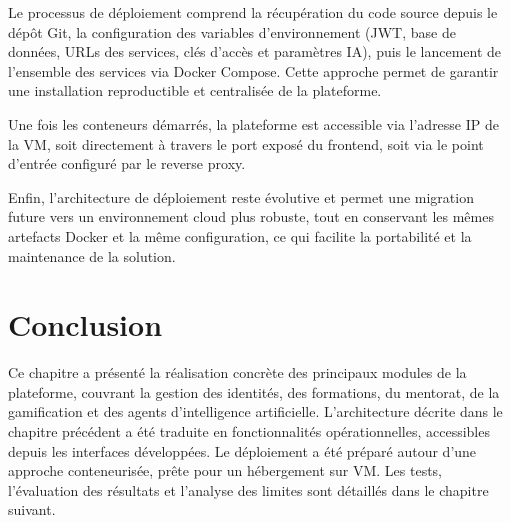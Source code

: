 Le processus de déploiement comprend la récupération du code source depuis le dépôt Git, la configuration des variables d'environnement (JWT, base de données, URLs des services, clés d'accès et paramètres IA), puis le lancement de l'ensemble des services via Docker Compose. Cette approche permet de garantir une installation reproductible et centralisée de la plateforme.

Une fois les conteneurs démarrés, la plateforme est accessible via l'adresse IP de la VM, soit directement à travers le port exposé du frontend, soit via le point d'entrée configuré par le reverse proxy.

Enfin, l'architecture de déploiement reste évolutive et permet une migration future vers un environnement cloud plus robuste, tout en conservant les mêmes artefacts Docker et la même configuration, ce qui facilite la portabilité et la maintenance de la solution.

\section{Conclusion}

Ce chapitre a présenté la réalisation concrète des principaux modules de la plateforme, couvrant la gestion des identités, des formations, du mentorat, de la gamification et des agents d'intelligence artificielle. L'architecture décrite dans le chapitre précédent a été traduite en fonctionnalités opérationnelles, accessibles depuis les interfaces développées. Le déploiement a été préparé autour d'une approche conteneurisée, prête pour un hébergement sur VM. Les tests, l'évaluation des résultats et l'analyse des limites sont détaillés dans le chapitre suivant.
